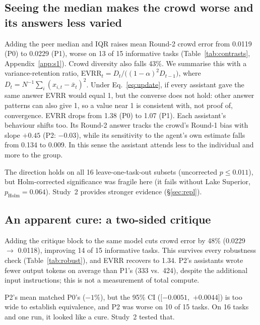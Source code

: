 \documentclass[10pt]{article}
\theoremstyle{manuscript}\newtheorem{proposition}{Proposition}
\newcommand{\pH}{p_{\text{Holm}}}
\begin{document}
\subsection{Seeing the median makes the crowd worse and its answers less varied}\label{sec:herd}
Adding the peer median and IQR raises mean Round-2 crowd error from 0.0119 (P0) to 0.0229 (P1), worse on 13 of 15 informative tasks (Table~\ref{tab:contrasts}, Appendix~\ref{app:s1}). Crowd diversity also falls 43\%. We summarise this with a variance-retention ratio, EVRR$_t=D_t/\big((1-\alpha)^2D_{t-1}\big)$, where $D_t=N^{-1}\sum_i(x_{i,t}-\bar x_t)^2$. Under Eq.~\eqref{eq:update}, if every assistant gave the same answer EVRR would equal 1, but the converse does not hold: other answer patterns can also give 1, so a value near 1 is consistent with, not proof of, convergence. EVRR drops from 1.38 (P0) to 1.07 (P1). Each assistant's behaviour shifts too. Its Round-2 answer tracks the crowd's Round-1 bias with slope $+0.45$ (P2: $-0.03$), while its sensitivity to the agent's own estimate falls from 0.134 to 0.009. In this sense the assistant attends less to the individual and more to the group.

The direction holds on all 16 leave-one-task-out subsets (uncorrected $p\le0.011$), but Holm-corrected significance was fragile here (it fails without Lake Superior, $\pH=0.064$). Study~2 provides stronger evidence (\S\ref{sec:repl}).

\subsection{An apparent cure: a two-sided critique}\label{sec:rescue}
Adding the critique block to the same model cuts crowd error by 48\% (0.0229 $\to$ 0.0118), improving 14 of 15 informative tasks. This survives every robustness check (Table~\ref{tab:robust}), and EVRR recovers to 1.34. P2's assistants wrote fewer output tokens on average than P1's (333 vs.\ 424), despite the additional input instructions; this is not a measurement of total compute.

P2's mean matched P0's ($-1\%$), but the 95\% CI ($[-0.0051,$ $+0.0044]$) is too wide to establish equivalence, and P2 was worse on 10 of 15 tasks. On 16 tasks and one run, it looked like a cure. Study~2 tested that.
\end{document}
